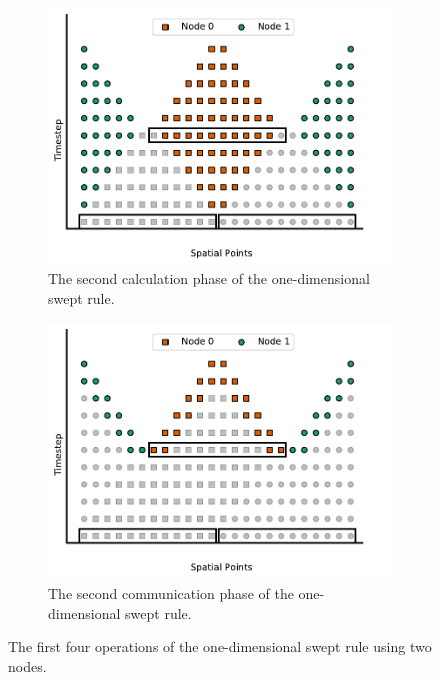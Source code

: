 \documentclass[mca,article,submit,moreauthors,pdftex]{Definitions/mdpi}
\begin{document}
\begin{figure}[htbp]
    \par\bigskip
    \hfill
    \begin{subfigure}[b]{0.45\textwidth}
        \widefigure
        \includegraphics[scale=0.5]{figs/c_Diamond.pdf}
        \caption{The second calculation phase of the one-dimensional swept rule.}
        \label{fig:Diamond}
    \end{subfigure}
    \hfill
    \begin{subfigure}[b]{0.45\textwidth}
        \widefigure
        \includegraphics[scale=0.5]{figs/d_Comm2.pdf}
        \caption{The second communication phase of the one-dimensional swept rule.}
        \label{fig:1d-comm-2}
    \end{subfigure}
    \caption{The first four operations of the one-dimensional swept rule using two nodes.}
    \label{fig:1d-swept-rule}
\end{figure}
\end{document}
